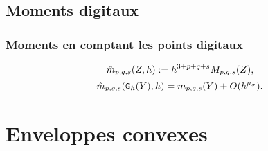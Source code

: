 \subsection{Moments digitaux}
%
\subsubsection{Moments en comptant les points digitaux}
%
\begin{equation}
  \hat{m}_{p,q,s}(Z,h) := h^{3+p+q+s}M_{p,q,s}(Z),
\end{equation}
%
\begin{equation}
  \label{huxleylike}
  \hat{m}_{p,q,s}(\DigF{Y}{h},h)= m_{p,q,s}(Y) + O(h^{\mu_{{\sigma}}}).
\end{equation}
%
\section{Enveloppes convexes}
%




